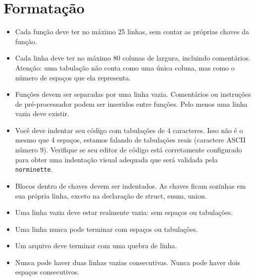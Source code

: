 \documentclass{42-pt}
\begin{document}
    \section{Formatação}

            \begin{itemize}

            \item Cada função deve ter no máximo 25 linhas, sem contar as próprias chaves da função.

            \item Cada linha deve ter no máximo 80 colunas de largura, incluindo comentários.
            Atenção: uma tabulação não conta como uma única coluna, mas como o número de espaços que ela representa.

            \item Funções devem ser separadas por uma linha vazia. Comentários ou instruções de pré-processador
            podem ser inseridos entre funções. Pelo menos uma linha vazia deve existir.

            \item Você deve indentar seu código com tabulações de 4 caracteres.
            Isso não é o mesmo que 4 espaços, estamos falando de tabulações reais (caractere ASCII número 9).
            Verifique se seu editor de código está corretamente configurado para obter uma indentação visual adequada
            que será validada pela \texttt{norminette}.

            \item Blocos dentro de chaves devem ser indentados. As chaves ficam sozinhas em sua própria linha,
            exceto na declaração de struct, enum, union.

            \item Uma linha vazia deve estar realmente vazia: sem espaços ou tabulações.

            \item Uma linha nunca pode terminar com espaços ou tabulações.

            \item Um arquivo deve terminar com uma quebra de linha.
            
            \item Nunca pode haver duas linhas vazias consecutivas.
            Nunca pode haver dois espaços consecutivos.


\end{itemize}
\end{document}
